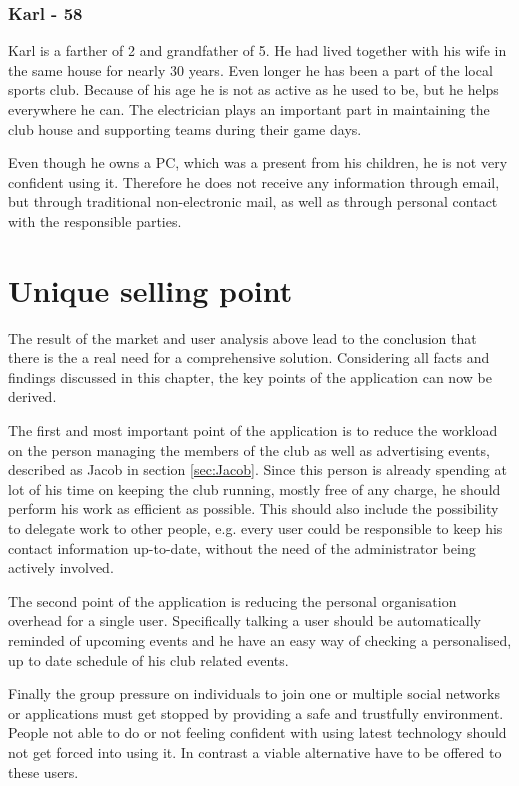 \subsubsection{Karl - 58}
Karl is a farther of 2 and grandfather of 5. He had lived together with his wife in the same house for nearly 30 years. Even longer he has been a part of the local sports club. Because of his age he is not as active as he used to be, but he helps everywhere he can. The electrician plays an important part in maintaining the club house and supporting teams during their game days.

Even though he owns a PC, which was a present from his children, he is not very confident using it. Therefore he does not receive any information through email, but through traditional non-electronic mail, as well as through personal contact with the responsible parties.  

\section{Unique selling point}
\label{sec:SellingPoint}

The result of the market and user analysis above lead to the conclusion that there is the a real need for a comprehensive solution. Considering all facts and findings discussed in this chapter, the key points of the application can now be derived. 

The first and most important point of the application is to reduce the workload on the person managing the members of the club as well as advertising events, described as Jacob in section \vref{sec:Jacob}. Since this person is already spending at lot of his time on keeping the club running, mostly free of any charge, he should perform his work as efficient as possible. This should also include the possibility to delegate work to other people, e.g. every user could be responsible to keep his contact information up-to-date, without the need of the administrator being actively involved.

The second point of the application is reducing the personal organisation overhead for a single user. Specifically talking a user should be automatically reminded of upcoming events and he have an easy way of checking a personalised, up to date schedule of his club related events.

Finally the group pressure on individuals to join one or multiple social networks or applications must get stopped by providing a safe and trustfully environment. People not able to do or not feeling confident with using latest technology should not get forced into using it. In contrast a viable alternative have to be offered to these users. 

